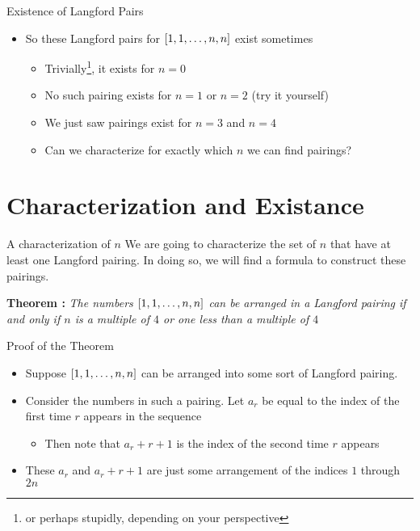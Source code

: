 \documentclass[aspectratio=169, handout]{beamer}
\begin{document}
\begin{frame}{Existence of Langford Pairs}
    \begin{itemize}
        \item So these Langford pairs for $\bqty{1, 1, \ldots, n, n}$ exist sometimes
        \begin{itemize}
            \item Trivially\footnote{or perhaps stupidly, depending on your perspective}, it exists for $n = 0$ \pause
            \item No such pairing exists for $n = 1$ or $n = 2$ \textcolor{sigma@alertred}{(try it yourself)} \pause
            \item We just saw pairings exist for $n = 3$ and $n = 4$ \pause
            \item Can we characterize for exactly which $n$ we can find pairings?
        \end{itemize}
    \end{itemize}
\end{frame}

\section{Characterization and Existance}
\frame{\sectionpage}

\begin{frame}{A characterization of $n$}
    We are going to characterize the set of $n$ that have at least one Langford pairing. In doing so, we will find a formula to \textcolor{sigma@mainblue}{construct} these pairings. \pause
    
    \vspace{30pt}
    
    \textbf{Theorem \cite{Langford4m}: }{\itshape The numbers $\bqty{1, 1, \ldots, n, n}$ can be arranged in a Langford pairing if and only if $n$ is a multiple of $4$ or one less than a multiple of $4$}
\end{frame}

\begin{frame}{Proof of the Theorem}
    \begin{itemize}
        \item Suppose $\bqty{1, 1, \ldots, n, n}$ can be arranged into some sort of Langford pairing. \pause
        \item Consider the numbers in such a pairing. Let $a_r$ be equal to the index of the first time $r$ appears in the sequence
        \begin{itemize}
            \item Then note that $a_r + r + 1$ is the index of the second time $r$ appears
        \end{itemize} \pause
        \item These $a_r$ and $a_r + r + 1$ are just some arrangement of the indices $1$ through $2n$
    \end{itemize}
\end{frame}
\end{document}
